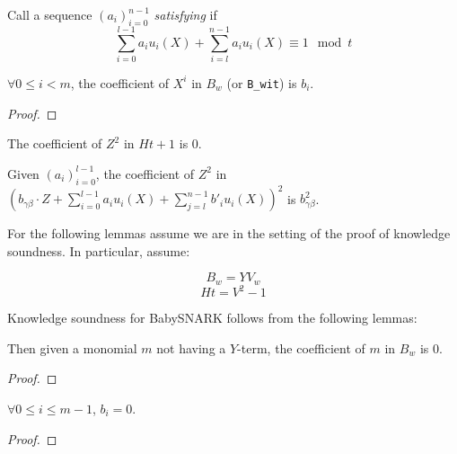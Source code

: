 \begin{definition}\label{def:satisfying}
\leanok
{}
Call a sequence $(a_i)_{i=0}^{n-1}$ \emph{satisfying} if 
\[
\sum_{i = 0}^{l - 1} a_i u_i(X) + \sum_{i = l}^{n - 1} a_i u_i (X) \equiv 1 \mod t
\]
\end{definition}

\begin{lemma}\label{lem:B_coeff}
\leanok
{}
$\forall 0 \le i < m$, the coefficient of $X^{i}$ in $B_{w}$ (or \texttt{B\_wit}) is $b_i$.
\end{lemma}
\begin{proof}
\leanok
\end{proof}

\begin{lemma} \label{lem:Z2_Ht_coeff}
\leanok
The coefficient of $Z^2$ in $H t + 1$ is 0.
\end{lemma}

\begin{lemma} \label{lem:B_sq_coeff}
\leanok
{}
Given $(a_i)_{i = 0}^{l - 1}$, the coefficient of $Z^2$ in $(b_{\gamma \beta} \cdot Z + \sum_{i = 0}^{l - 1} a_i u_i (X) + \sum_{j = l}^{n - 1} b'_i u_i (X))^2$ is $b_{\gamma \beta}^2$.
\end{lemma}
  
For the following lemmas assume we are in the setting of the proof of knowledge soundness. In particular, assume:

\begin{equation}
B_w = YV_w
\end{equation}
\begin{equation}
Ht = V^2 - 1  
\end{equation}

Knowledge soundness for BabySNARK follows from the following lemmas:

\begin{lemma}\label{lem:B_Y_coeff}
\leanok
{}
Then given a monomial $m$ not having a $Y$-term, the coefficient of $m$ in $B_w$ is 0.
\end{lemma}
\begin{proof}
\leanok
\end{proof}

\begin{lemma}\label{lem:b_i_zero}
\leanok
$\forall 0 \le i \le m - 1$, $b_i = 0$.
\end{lemma}
\begin{proof}
\leanok
\end{proof}

